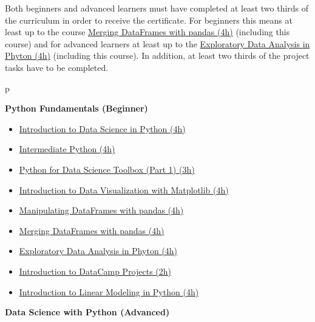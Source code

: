 \documentclass[
  11pt,
]{book}
\providecommand{\tightlist}{%
  \setlength{\itemsep}{0pt}\setlength{\parskip}{0pt}}
\begin{document}
Both beginners and advanced learners must have completed at least two
thirds of the curriculum in order to receive the certificate. For
beginners this means at least up to the course
\href{https://learn.datacamp.com/courses/merging-dataframes-with-pandas}{Merging
DataFrames with pandas (4h)} (including this course) and for advanced
learners at least up to the
\href{https://learn.datacamp.com/courses/exploratory-data-analysis-in-python}{Exploratory
Data Analysis in Phyton (4h)} (including this course). In addition, at
least two thirds of the project tasks have to be completed.

\begin{tipsp}p

\textbf{Python Fundamentals (Beginner) }

\begin{itemize}
\tightlist
\item
  \href{https://www.datacamp.com/courses/introduction-to-data-science-in-python}{Introduction
  to Data Science in Python (4h)}
\item
  \href{https://www.datacamp.com/courses/intermediate-python-for-data-science}{Intermediate
  Python (4h)}
\item
  \href{https://www.datacamp.com/courses/python-data-science-toolbox-part-1}{Python
  for Data Science Toolbox (Part 1) (3h)}
\item
  \href{https://www.datacamp.com/courses/introduction-to-matplotlib}{Introduction
  to Data Visualization with Matplotlib (4h)}
\item
  \href{https://www.datacamp.com/courses/manipulating-dataframes-with-pandas}{Manipulating
  DataFrames with pandas (4h)}
\item
  \href{https://www.datacamp.com/courses/merging-dataframes-with-pandas}{Merging
  DataFrames with pandas (4h)}
\item
  \href{https://www.datacamp.com/courses/exploratory-data-analysis-in-python}{Exploratory
  Data Analysis in Phyton (4h)}
\item
  \href{https://www.datacamp.com/projects/33}{Introduction to DataCamp
  Projects (2h)}
\item
  \href{https://www.datacamp.com/courses/introduction-to-linear-modeling-in-python}{Introduction
  to Linear Modeling in Python (4h)}
\end{itemize}

\textbf{Data Science with Python (Advanced) }


\end{tipsp}
\end{document}
